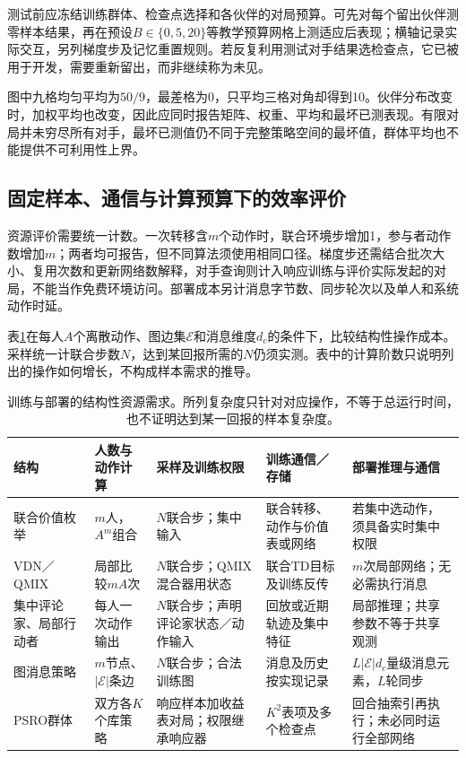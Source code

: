 测试前应冻结训练群体、检查点选择和各伙伴的对局预算。可先对每个留出伙伴测零样本结果，再在预设$B\in\{0,5,20\}$等教学预算网格上测适应后表现；横轴记录实际交互，另列梯度步及记忆重置规则。若反复利用测试对手结果选检查点，它已被用于开发，需要重新留出，而非继续称为未见。

图中九格均匀平均为$50/9$，最差格为0，只平均三格对角却得到10。伙伴分布改变时，加权平均也改变，因此应同时报告矩阵、权重、平均和最坏已测表现。有限对局并未穷尽所有对手，最坏已测值仍不同于完整策略空间的最坏值，群体平均也不能提供不可利用性上界。

\subsection{固定样本、通信与计算预算下的效率评价}
\label{sec:rl-multi-agent-efficiency}

资源评价需要统一计数。一次转移含$m$个动作时，联合环境步增加1，参与者动作数增加$m$；两者均可报告，但不同算法须使用相同口径。梯度步还需结合批次大小、复用次数和更新网络数解释，对手查询则计入响应训练与评价实际发起的对局，不能当作免费环境访问。部署成本另计消息字节数、同步轮次以及单人和系统动作时延。

表\ref{tab:rl-multi-agent-resources}在每人$A$个离散动作、图边集$\mathcal E$和消息维度$d_c$的条件下，比较结构性操作成本。采样统一计联合步数$N$，达到某回报所需的$N$仍须实测。表中的计算阶数只说明列出的操作如何增长，不构成样本需求的推导。

\begin{table}[htbp]
 \centering
 \begin{tabularx}{\linewidth}{@{}l >{\raggedright\arraybackslash}X >{\raggedright\arraybackslash}X >{\raggedright\arraybackslash}X >{\raggedright\arraybackslash}X@{}}
 \toprule
 结构 & 人数与动作计算 & 采样及训练权限 & 训练通信／存储 & 部署推理与通信\\
 \midrule
 联合价值枚举 & $m$人，$A^m$组合 & $N$联合步；集中输入 & 联合转移、动作与价值表或网络 & 若集中选动作，须具备实时集中权限\\
 VDN／QMIX & 局部比较$mA$次 & $N$联合步；QMIX混合器用状态 & 联合TD目标及训练反传 & $m$次局部网络；无必需执行消息\\
 集中评论家、局部行动者 & 每人一次动作输出 & $N$联合步；声明评论家状态／动作输入 & 回放或近期轨迹及集中特征 & 局部推理；共享参数不等于共享观测\\
 图消息策略 & $m$节点、$|\mathcal E|$条边 & $N$联合步；合法训练图 & 消息及历史按实现记录 & $L|\mathcal E|d_c$量级消息元素，$L$轮同步\\
 PSRO群体 & 双方各$K$个库策略 & 响应样本加收益表对局；权限继承响应器 & $K^2$表项及多个检查点 & 回合抽索引再执行；未必同时运行全部网络\\
 \bottomrule
 \end{tabularx}
 \caption{训练与部署的结构性资源需求。所列复杂度只针对对应操作，不等于总运行时间，也不证明达到某一回报的样本复杂度。}
 \label{tab:rl-multi-agent-resources}
\end{table}

